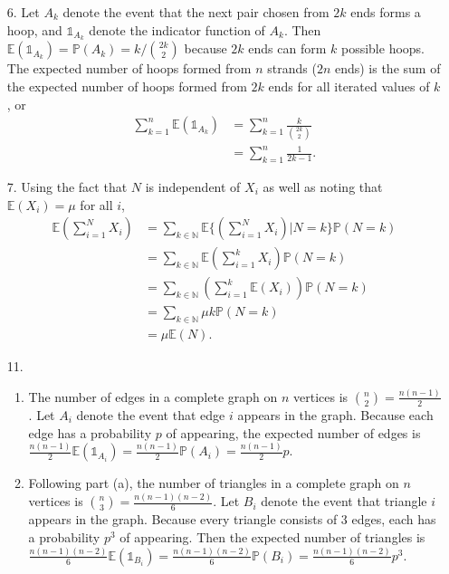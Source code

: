 \documentclass[a4paper,12pt]{article}
\begin{document}
\begin{enumerate}
    \item[6.]
        Let $A_k$ denote the event that the next pair chosen from $2k$ ends forms a hoop, and $\mathds{1}_{A_k}$ denote the indicator function of $A_k$. Then $\mathbb{E}(\mathds{1}_{A_k}) = \mathbb{P}(A_k) = k / \binom{2k}{2}$ because $2k$ ends can form $k$ possible hoops. The expected number of hoops formed from $n$ strands ($2n$ ends) is the sum of the expected number of hoops formed from $2k$ ends for all iterated values of $k$, or
        \begin{align*}
            \sum_{k = 1}^{n} \mathbb{E}(\mathds{1}_{A_k}) &= \sum_{k = 1}^{n} \frac{k}{\binom{2k}{2}} \\
            &= \sum_{k = 1}^{n} \frac{1}{2k - 1}.
        \end{align*}

    \item[7.]
        Using the fact that $N$ is independent of $X_i$ as well as noting that $\mathbb{E}(X_i) = \mu$ for all $i$,
        \begin{align*}
            \mathbb{E}\left( \sum_{i = 1}^{N} X_i \right) &= \sum_{k \in \mathbb{N}} \mathbb{E}\{(\sum_{i = 1}^{N} X_i) | N = k \} \mathbb{P}(N = k) \\
            &= \sum_{k \in \mathbb{N}} \mathbb{E}\left( \sum_{i = 1}^{k} X_i \right) \mathbb{P}(N = k) \\
            &= \sum_{k \in \mathbb{N}} \left( \sum_{i = 1}^{k} \mathbb{E}(X_i) \right) \mathbb{P}(N = k) \\
            &= \sum_{k \in \mathbb{N}} \mu k \mathbb{P}(N = k) \\
            &= \mu \mathbb{E}(N).
        \end{align*}

    \item[11.]
        \begin{enumerate}
            \item
                The number of edges in a complete graph on $n$ vertices is $\binom{n}{2} = \frac{n(n - 1)}{2}$. Let $A_i$ denote the event that edge $i$ appears in the graph. Because each edge has a probability $p$ of appearing, the expected number of edges is $\frac{n(n - 1)}{2} \mathbb{E}(\mathds{1}_{A_i}) = \frac{n(n - 1)}{2} \mathbb{P}(A_i) = \frac{n(n - 1)}{2} p$.

            \item
                Following part (a), the number of triangles in a complete graph on $n$ vertices is $\binom{n}{3} = \frac{n(n - 1)(n - 2)}{6}$. Let $B_i$ denote the event that triangle $i$ appears in the graph. Because every triangle consists of 3 edges, each has a probability $p^3$ of appearing. Then the expected number of triangles is $\frac{n(n - 1)(n - 2)}{6} \mathbb{E}(\mathds{1}_{B_i}) = \frac{n(n - 1)(n - 2)}{6} \mathbb{P}(B_i) = \frac{n(n - 1)(n - 2)}{6} p^3$.
        \end{enumerate}


\end{enumerate}
\end{document}
